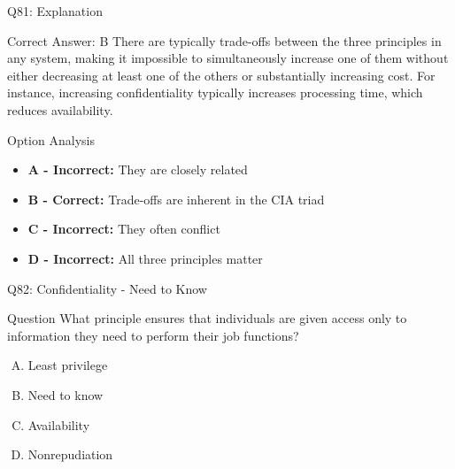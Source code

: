 \documentclass{beamer}
\begin{document}
	\begin{frame}{Q81: Explanation}
		\begin{block}{Correct Answer: B}
			There are typically trade-offs between the three principles in any system, making it impossible to simultaneously increase one of them without either decreasing at least one of the others or substantially increasing cost. For instance, increasing confidentiality typically increases processing time, which reduces availability.
		\end{block}
		\begin{block}{Option Analysis}
			\begin{itemize}
				\item \textbf{A - Incorrect:} They are closely related
				\item \textbf{B - Correct:} Trade-offs are inherent in the CIA triad
				\item \textbf{C - Incorrect:} They often conflict
				\item \textbf{D - Incorrect:} All three principles matter
			\end{itemize}
		\end{block}
	\end{frame}
	
	\begin{frame}{Q82: Confidentiality - Need to Know}
		\begin{block}{Question}
			What principle ensures that individuals are given access only to information they need to perform their job functions?
		\end{block}
		\begin{enumerate}[(A)]
			\item Least privilege
			\item Need to know
			\item Availability
			\item Nonrepudiation
		\end{enumerate}
	\end{frame}
	
\end{document}
